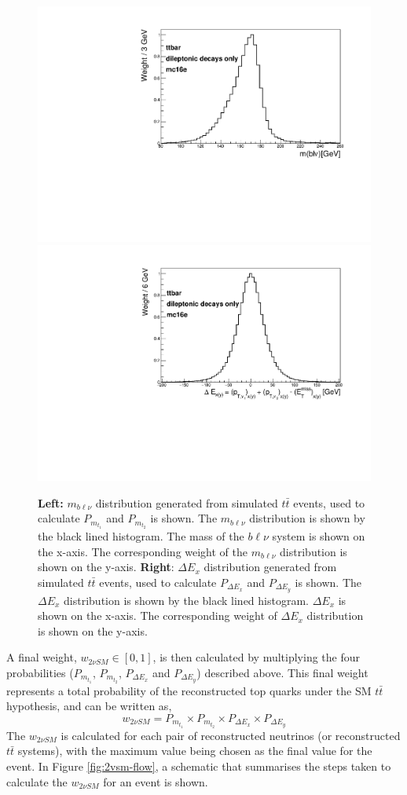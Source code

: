 \begin{figure}[h!]
	\includegraphics[width=0.47\linewidth]{figures/mtop_2vSM.pdf}
	\includegraphics[width=0.47\linewidth]{figures/DExy_2vSM.pdf}
	\centering
	\caption{\textbf{Left:} $m_{b\ell\nu}$ distribution generated from simulated $t\bar{t}$ events, used to calculate $P_{m_{t_{1}}}$ and $P_{m_{t_{2}}}$ is shown. The $m_{b\ell\nu}$ distribution is shown by the black lined histogram. The mass of the $b\ell\nu$ system is shown on the x-axis. The corresponding weight of the $m_{b\ell\nu}$ distribution is shown on the y-axis. \textbf{Right}: $\Delta E_{x}$ distribution generated from simulated $t\bar{t}$ events, used to calculate $P_{\Delta E_{x}}$ and $P_{\Delta E_{y}}$ is shown. The $\Delta E_{x}$ distribution is shown by the black lined histogram. $\Delta E_{x}$ is shown on the x-axis. The corresponding weight of $\Delta E_{x}$ distribution is shown on the y-axis. }
	\label{fig:2vSM-mass-dist}
\end{figure}A final weight, $w_{2\nu SM} \in [0,1]$, is then calculated by multiplying the four probabilities ($P_{m_{t_{1}}}$, $P_{m_{t_{2}}}$, $P_{\Delta E_{x}}$ and $P_{\Delta E_{y}}$) described above. This final weight represents a total probability of the reconstructed top quarks under the SM $t\bar{t}$ hypothesis, and can be written as,
\begin{equation}
    w_{2\nu SM} = P_{m_{t_{1}}} \times P_{m_{t_{2}}} \times P_{\Delta E_{x}} \times P_{\Delta E_{y}}
\end{equation}
The $w_{2\nu SM}$ is calculated for each pair of reconstructed neutrinos (or reconstructed $t\bar{t}$ systems), with the maximum value being chosen as the final value for the event. In Figure \ref{fig:2vsm-flow}, a schematic that summarises the steps taken to calculate the $w_{2\nu SM}$ for an event is shown.
